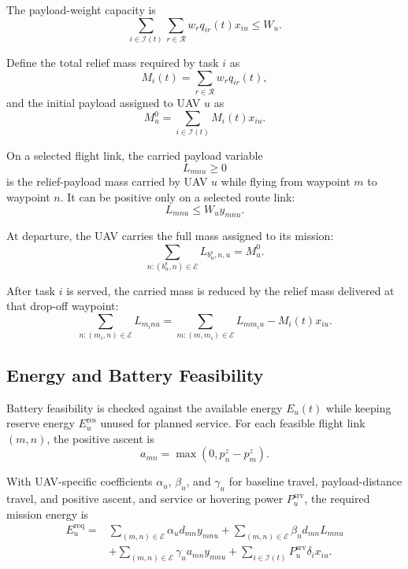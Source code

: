 \documentclass[conference]{IEEEtran}
\begin{document}
The payload-weight capacity is
\begin{equation}
\sum_{i\in\mathcal{I}(t)}
\sum_{r\in\mathcal{R}}
w_r q_{ir}(t)x_{iu}
\leq
W_u.
\end{equation}

Define the total relief mass required by task $i$ as
\begin{equation}
M_i(t)
=
\sum_{r\in\mathcal{R}}
w_r q_{ir}(t),
\end{equation}
and the initial payload assigned to UAV $u$ as
\begin{equation}
M_u^0
=
\sum_{i\in\mathcal{I}(t)}
M_i(t)x_{iu}.
\end{equation}

On a selected flight link, the carried payload variable
\[
L_{mnu}\geq 0
\]
is the relief-payload mass carried by UAV $u$ while flying from waypoint $m$ to waypoint $n$. It can be positive only on a selected route link:
\begin{equation}
L_{mnu}
\leq
W_u y_{mnu}.
\end{equation}

At departure, the UAV carries the full mass assigned to its mission:
\begin{equation}
\sum_{n:(b_u^{\mathrm{s}},n)\in\mathcal{E}}
L_{b_u^{\mathrm{s}},n,u}
=
M_u^0.
\end{equation}

After task $i$ is served, the carried mass is reduced by the relief mass delivered at that drop-off waypoint:
\begin{equation}
\sum_{n:(m_i,n)\in\mathcal{E}}
L_{m_i n u}
=
\sum_{m:(m,m_i)\in\mathcal{E}}
L_{m m_i u}
-
M_i(t)x_{iu}.
\end{equation}

\subsection{Energy and Battery Feasibility}

Battery feasibility is checked against the available energy $E_u(t)$ while keeping reserve energy $E_u^{\mathrm{res}}$ unused for planned service. For each feasible flight link $(m,n)$, the positive ascent is
\begin{equation}
a_{mn}
=
\max(0,p_n^z-p_m^z).
\end{equation}

With UAV-specific coefficients $\alpha_u$, $\beta_u$, and $\gamma_u$ for baseline travel, payload-distance travel, and positive ascent, and service or hovering power $P_u^{\mathrm{srv}}$, the required mission energy is
\begin{equation}
\begin{aligned}
E_u^{\mathrm{req}}
=&
\sum_{(m,n)\in\mathcal{E}}
\alpha_u d_{mn}y_{mnu}
+\sum_{(m,n)\in\mathcal{E}}
\beta_u d_{mn}L_{mnu}\\
&+\sum_{(m,n)\in\mathcal{E}}
\gamma_u a_{mn}y_{mnu}
+\sum_{i\in\mathcal{I}(t)}
P_u^{\mathrm{srv}}\delta_i x_{iu}.
\end{aligned}
\end{equation}
\end{document}
